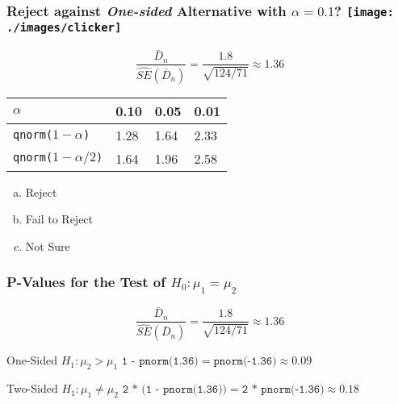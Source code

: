 \begin{frame}
\frametitle{Reject against \emph{One-sided} Alternative with $\alpha = 0.1$?  \texttt{[image: ./images/clicker]}}

	$$\boxed{\displaystyle \frac{\bar{D}_n}{\widehat{SE}(\bar{D}_n)}= \frac{1.8}{\sqrt{124/71}} \approx 1.36} $$

\begin{center}
\begin{tabular}{l|lll}
$\alpha$ &   0.10& 0.05 &0.01\\
\hline
\texttt{qnorm($1-\alpha$)} & 1.28 &1.64 &2.33\\
\texttt{qnorm($1-\alpha/2$)} &1.64 &1.96& 2.58
\end{tabular}
\end{center}

\begin{enumerate}[(a)]
\item Reject
\item Fail to Reject
\item Not Sure
\end{enumerate}



\end{frame}

\begin{frame}
\frametitle{P-Values for the Test of $H_0\colon \mu_1 = \mu_2$}

	$$\boxed{\displaystyle \frac{\bar{D}_n}{\widehat{SE}(\bar{D}_n)}= \frac{1.8}{\sqrt{124/71}} \approx 1.36} $$

\begin{block}{One-Sided $H_1\colon \mu_2 > \mu_1 $} 
$\texttt{1 - pnorm(1.36)} =  \texttt{pnorm(-1.36)}  \approx 0.09$ 
\end{block}

\begin{block}{Two-Sided $H_1 \colon \mu_1 \neq \mu_2$} 
$\texttt{2 * (1 - pnorm(1.36))} =  \texttt{2 * pnorm(-1.36)} \approx 0.18$
\end{block}
\end{frame}
